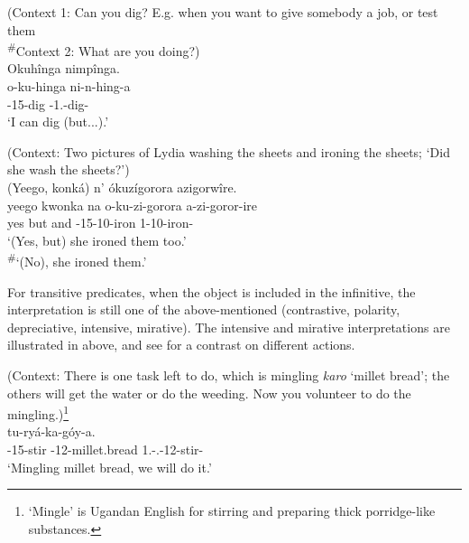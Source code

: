 \documentclass[output=paper]{langscibook}
\begin{document}
\ea
\label{bkm:Ref98834957}
(Context 1: Can you dig? E.g. when you want to give somebody a job, or test them\\
\textsuperscript{\#}Context 2: What are you doing?)\\
Okuhînga nimpînga.\\
\gll
o-ku-hinga  ni-n-hing-a\\
\AUG{}-15-dig  \IPFV{}-1\SG{}.\SM{}-dig-\FV{}\\
\glt ‘I can dig (but...).’\\

\z

\ea
\label{bkm:Ref98835964}
(Context: Two pictures of Lydia washing the sheets and ironing the sheets; ‘Did she wash the sheets?’)\\
(Yeego, konká) n’ ókuzígorora azigorwîre.\\
\gll
yeego  kwonka  na  o-ku-zi-gorora  a-zi-goror-ire\\
yes  but  and  \AUG{}-15-10\OM{}-iron  1\SM{}-10\OM{}-iron-\PFV{}\\
\glt
‘(Yes, but) she ironed them too.’\\

\textsuperscript{\#}`(No), she ironed them.’\\
\z

For transitive predicates, when the object is included in the infinitive, the interpretation is still one of the above-mentioned (contrastive, polarity, depreciative, intensive, mirative). The intensive and mirative interpretations are illustrated in  above, and see  for a contrast on different actions.

\ea
\label{bkm:Ref98835064}
(Context: There is one task left to do, which is mingling \textit{karo} ‘millet bread’; the others will get the water or do the weeding. Now you volunteer to do the mingling.)\footnote{‘Mingle’ is Ugandan English for stirring and preparing thick porridge-like substances.}\\
\gll
  [O-ku-góyá  a-ka-ró]  tu-ryá-ka-góy-a.\\
  {\db}\AUG{}-15-stir  \AUG{}-12-millet.bread  1\PL{}.\SM{}-\N.\FUT{}-12\OM{}-stir-\FV{}\\
\glt
  \glt ‘Mingling millet bread, we will do it.’\\
\end{document}
